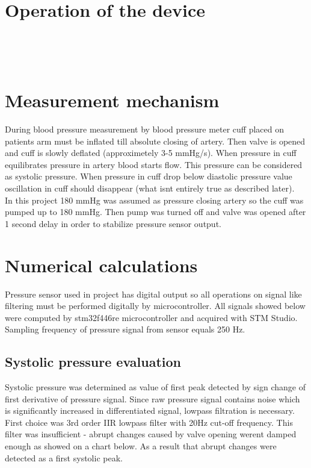 ~\newline
\hypertarget{index_device_operation}{}\section{Operation of the device}\label{index_device_operation}
 ~\newline


~\newline
\hypertarget{index_meas_mechanism}{}\section{Measurement mechanism}\label{index_meas_mechanism}
During blood pressure measurement by blood pressure meter cuff placed on patient\textquotesingle{}s arm must be inflated till absolute closing of artery. Then valve is opened and cuff is slowly deflated (approximetely 3-\/5 mm\+Hg/s). When pressure in cuff equilibrates pressure in artery blood starts flow. This pressure can be considered as systolic pressure. When pressure in cuff drop below diastolic pressure value oscillation in cuff should disappear (what isn\textquotesingle{}t entirely true as described later).  ~\newline
 In this project 180 mm\+Hg was assumed as pressure closing artery so the cuff was pumped up to 180 mm\+Hg. Then pump was turned off and valve was opened after 1 second delay in order to stabilize pressure sensor output. ~\newline
\hypertarget{index_numerical_calculations}{}\section{Numerical calculations}\label{index_numerical_calculations}
Pressure sensor used in project has digital output so all operations on signal like filtering must be performed digitally by microcontroller. All signals showed below were computed by stm32f446re microcontroller and acquired with S\+TM Studio. Sampling frequency of pressure signal from sensor equals 250 Hz.\hypertarget{index_SYS_pressure_calc}{}\subsection{Systolic pressure evaluation}\label{index_SYS_pressure_calc}
Systolic pressure was determined as value of first peak detected by sign change of first derivative of pressure signal. Since raw pressure signal contains noise which is significantly increased in differentiated signal, lowpass filtration is necessary. First choice was 3rd order I\+IR lowpass filter with 20Hz cut-\/off frequency. This filter was insufficient -\/ abrupt changes caused by valve opening weren\textquotesingle{}t damped enough as showed on a chart below. As a result that abrupt changes were detected as a first systolic peak.

